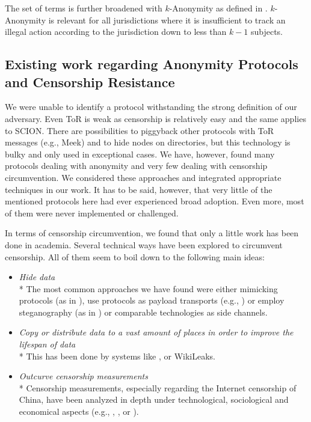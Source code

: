 \documentclass[acmsmall, screen]{acmart}
\begin{document}
The set of terms is further broadened with $k$-Anonymity as defined in \cite{k-anonymous:ccs2003}. $k$-Anonymity is relevant for all jurisdictions where it is insufficient to track an illegal action according to the jurisdiction down to less than $k-1$ subjects.

\subsection{Existing work regarding Anonymity Protocols and Censorship Resistance}
We were unable to identify a protocol withstanding the strong definition of our adversary. Even ToR is weak as censorship is relatively easy and the same applies to SCION. There are possibilities to piggyback other protocols with ToR messages (e.g., Meek) and to hide nodes on directories, but this technology is bulky and only used in exceptional cases. We have, however, found many protocols dealing with anonymity and very few dealing with censorship circumvention. We considered these approaches and integrated appropriate techniques in our work. It has to be said, however, that very little of the mentioned protocols here had ever experienced broad adoption. Even more, most of them were never implemented or challenged. 

In terms of censorship circumvention, we found that only a little work has been done in academia. Several technical ways have been explored to circumvent censorship. All of them seem to boil down to the following main ideas:
\begin{itemize}
	\item \emph{Hide data}\\*
	The most common approaches we have found were either mimicking protocols (as in \cite{mohajeri2013skypemorph}), use protocols as payload transports (e.g., \cite{AthanRAM07}) or employ steganography (as in \cite{f5}) or comparable technologies as side channels.
	\item \emph{Copy or distribute data to a vast amount of places in order to improve the lifespan of data}\\*
	This has been done by systems like \cite{freenet}, or WikiLeaks.
	\item \emph{Outcurve censorship measurements}\\*
	Censorship measurements, especially regarding the Internet censorship of China, have been analyzed in depth under technological, sociological and economical aspects (e.g., \cite{Ensafi_2015}, \cite{Clayton_2006}, or \cite{lowe2007great}).
\end{itemize}
\end{document}
